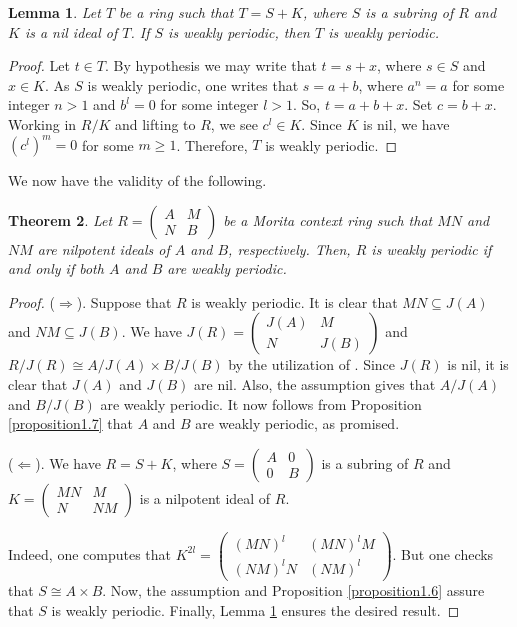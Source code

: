 \documentclass[12pt]{amsart}
\newtheorem{thm}{Theorem}[section]
\newtheorem{lem}[thm]{Lemma}
\theoremstyle{definition}
\theoremstyle{remark}
\numberwithin{equation}{section}
\begin{document}
\begin{lem} \label{lemma5.4}
Let $T$ be a ring such that $T=S+K$, where $S$ is a subring of $R$ and $K$ is a nil ideal of $T$. If $S$ is weakly periodic, then $T$ is weakly periodic.
\end{lem}

\begin{proof}
Let $t \in T$. By hypothesis we may write that $t=s+x$, where $s\in S$ and $x\in K$. As $S$ is weakly periodic, one writes that $s=a+b$, where $a^n=a$ for some integer $n>1$ and $b^l=0$ for some integer $l>1$. So, $t=a+b+x$. Set $c=b+x$. Working in $R/K$ and lifting to $R$, we see $c^l \in K$. Since $K$ is nil, we have ${(c^l)}^m=0$ for some $m \geq 1$. Therefore, $T$ is weakly periodic.  
\end{proof}

We now have the validity of the following.

\begin{thm} \label{theorem5.5}
Let
$R =\begin{pmatrix}
  A & M\\
  N & B
  \end{pmatrix}$ be a Morita context ring such that $MN$ and $NM$ are nilpotent ideals of $A$ and $B$, respectively. Then, $R$ is weakly periodic if and only if both $A$ and $B$ are weakly periodic.
\end{thm}

\begin{proof}
($\Rightarrow$). Suppose that $R$ is weakly periodic. It is clear that $MN \subseteq J(A)$ and $NM \subseteq J(B)$. We have
$J(R)=\begin{pmatrix}
          J(A) & M \\
          N    & J(B)
       \end{pmatrix}$ and $R/J(R) \cong A/J(A) \times B/J(B)$ by the utilization of \cite[Lemma 3.1]{TLZ}.
Since $J(R)$ is nil, it is clear that $J(A)$ and $J(B)$ are nil. Also, the assumption gives that $A/J(A)$ and $B/J(B)$ are weakly periodic. It now follows from Proposition \ref{proposition1.7} that $A$ and $B$ are weakly periodic, as promised.

($\Leftarrow$). We have $R=S+K$, where
$S=\begin{pmatrix}
     A & 0 \\
     0 & B
\end{pmatrix}$ is a subring of $R$ and
$K=\begin{pmatrix}
   MN & M \\
   N  & NM
\end{pmatrix}$ is a nilpotent ideal of $R$.

Indeed, one computes that $K^{2l}=
\begin{pmatrix}
{(MN)}^l & {(MN)}^lM \\
{(NM)}^lN & {(NM)}^l
\end{pmatrix}$. But one checks that $S\cong A \times B$. Now, the assumption and Proposition \ref{proposition1.6} assure that $S$ is weakly periodic. Finally, Lemma \ref{lemma5.4} ensures the desired result.
\end{proof}
\end{document}
